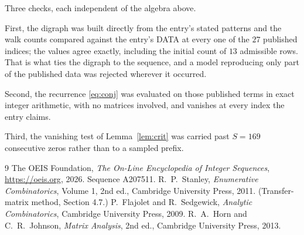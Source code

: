 \documentclass[11pt,a4paper]{article}
\theoremstyle{plain}
\theoremstyle{definition}
\begin{document}
Three checks, each independent of the algebra above.

First, the digraph was built directly from the entry's stated patterns and the walk counts
compared against the entry's DATA at every one of the $27$ published indices; the
values agree exactly, including the initial count of $13$ admissible rows. That is
what ties the digraph to the sequence, and a model reproducing only part of the published
data was rejected wherever it occurred.

Second, the recurrence \eqref{eq:conj} was evaluated on those published terms in exact
integer arithmetic, with no matrices involved, and vanishes at every index the entry claims.

Third, the vanishing test of Lemma~\ref{lem:crit} was carried past $S=169$ consecutive
zeros rather than to a sampled prefix.

\begin{thebibliography}{9}
 The OEIS Foundation, \emph{The On-Line Encyclopedia of Integer
Sequences}, \url{https://oeis.org}, 2026. Sequence A207511.
 R.~P.~Stanley, \emph{Enumerative Combinatorics}, Volume 1, 2nd ed.,
Cambridge University Press, 2011. (Transfer-matrix method, Section 4.7.)
 P.~Flajolet and R.~Sedgewick, \emph{Analytic Combinatorics}, Cambridge
University Press, 2009.
 R.~A.~Horn and C.~R.~Johnson, \emph{Matrix Analysis}, 2nd ed., Cambridge
University Press, 2013.
\end{thebibliography}
\end{document}
